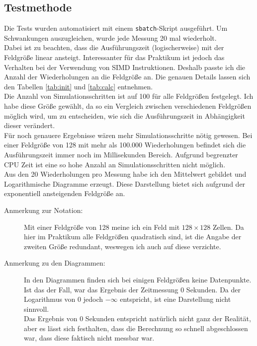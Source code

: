 \documentclass[german,plainarticle,hyperref,utf8]{zihpub}
\begin{document}
	\subsection{Testmethode}
	Die Tests wurden automatisiert mit einem \texttt{sbatch}-Skript ausgeführt. Um Schwankungen auszugleichen, wurde jede Messung 20 mal wiederholt.\\
	Dabei ist zu beachten, dass die Ausführungszeit (logischerweise) mit der Feldgröße linear ansteigt. Interessanter für das Praktikum ist jedoch das Verhalten bei der Verwendung von SIMD Instruktionen. Deshalb passte ich die Anzahl der Wiederholungen an die Feldgröße an. Die genauen Details lassen sich den Tabellen \ref{tab:init} und \ref{tab:calc} entnehmen.\\
	Die Anzahl von Simulationsschritten ist auf 100 für alle Feldgrößen festgelegt. Ich habe diese Größe gewählt, da so ein Vergleich zwischen verschiedenen Feldgrößen möglich wird, um zu entscheiden, wie sich die Ausführungszeit in Abhängigkeit dieser verändert.\\
	Für noch genauere Ergebnisse wären mehr Simulationsschritte nötig gewesen. Bei einer Feldgröße von 128 mit mehr als 100.000 Wiederholungen befindet sich die Ausführungszeit immer noch im Millisekunden Bereich. Aufgrund begrenzter CPU Zeit ist eine so hohe Anzahl an Simulationsschritten nicht möglich.\\
	
	Aus den 20 Wiederholungen pro Messung habe ich den Mittelwert gebildet und Logarithmische Diagramme erzeugt. Diese Darstellung bietet sich aufgrund der exponentiell ansteigenden Feldgröße an.\\
	
	\begin{description}
		\item[Anmerkung zur Notation:] Mit einer Feldgröße von 128 meine ich ein Feld mit $128\times 128$ Zellen. Da hier im Praktikum alle Feldgrößen quadratisch sind, ist die Angabe der zweiten Größe redundant, weswegen ich auch auf diese verzichte.
		\item[Anmerkung zu den Diagrammen:] In den Diagrammen finden sich bei einigen Feldgrößen keine Datenpunkte. Ist das der Fall, war das Ergebnis der Zeitmessung 0 Sekunden. Da der Logarithmus von 0 jedoch $-\infty$ entspricht, ist eine Darstellung nicht sinnvoll.\\
		Das Ergebnis von 0 Sekunden entspricht natürlich nicht ganz der Realität, aber es lässt sich festhalten, dass die Berechnung so schnell abgeschlossen war, dass diese faktisch nicht messbar war.
	\end{description}
\end{document}
